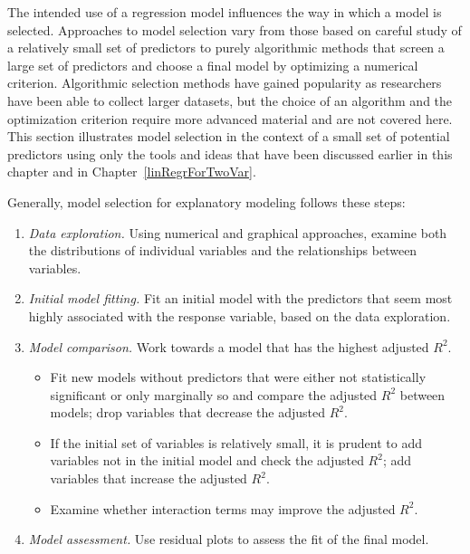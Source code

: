 The intended use of a regression model influences the way in which a model is selected. Approaches to model selection vary from those based on careful study of a relatively small set of predictors to purely algorithmic methods that screen a large set of predictors and choose a final model by optimizing a numerical criterion. Algorithmic selection methods have gained popularity as researchers have been able to collect larger datasets, but the choice of an algorithm and the optimization criterion require more advanced material and are not covered here. This section illustrates model selection in the context of a small set of potential predictors using only the tools and ideas that have been discussed earlier in this chapter and in Chapter~\ref{linRegrForTwoVar}. 

Generally, model selection for explanatory modeling follows these steps:

\begin{enumerate}
	\item \textit{Data exploration.} Using numerical and graphical approaches, examine both the distributions of individual variables and the relationships between variables.
	
	\item \textit{Initial model fitting.} Fit an initial model with the predictors that seem most highly associated with the response variable, based on the data exploration.
	
	\item \textit{Model comparison.} Work towards a model that has the highest adjusted $R^2$.
	
	\begin{itemize}
		\item Fit new models without predictors that were either not statistically significant or only marginally so and compare the adjusted $R^2$ between models; drop variables that decrease the adjusted $R^2$. 
		
		\item If the initial set of variables is relatively small, it is prudent to add variables not in the initial model and check the adjusted $R^2$; add variables that increase the adjusted $R^2$.
		
		\item Examine whether interaction terms may improve the adjusted $R^2$.
	\end{itemize}
	
	\item \textit{Model assessment.} Use residual plots to assess the fit of the final model. 
	
\end{enumerate}

